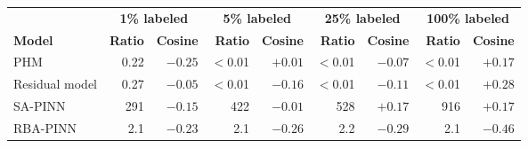 \begin{tabular}{lrrrrrrrr}
\toprule
 & \multicolumn{2}{c}{\textbf{1\% labeled}} & \multicolumn{2}{c}{\textbf{5\% labeled}} & \multicolumn{2}{c}{\textbf{25\% labeled}} & \multicolumn{2}{c}{\textbf{100\% labeled}} \\
\cmidrule(lr){2-3}\cmidrule(lr){4-5}\cmidrule(lr){6-7}\cmidrule(lr){8-9}
\textbf{Model} & \textbf{Ratio} & \textbf{Cosine} & \textbf{Ratio} & \textbf{Cosine} & \textbf{Ratio} & \textbf{Cosine} & \textbf{Ratio} & \textbf{Cosine} \\
\midrule
PHM & 0.22 & $-0.25$ & $<$0.01 & $+0.01$ & $<$0.01 & $-0.07$ & $<$0.01 & $+0.17$ \\
Residual model & 0.27 & $-0.05$ & $<$0.01 & $-0.16$ & $<$0.01 & $-0.11$ & $<$0.01 & $+0.28$ \\
SA-PINN & 291 & $-0.15$ & 422 & $-0.01$ & 528 & $+0.17$ & 916 & $+0.17$ \\
RBA-PINN & 2.1 & $-0.23$ & 2.1 & $-0.26$ & 2.2 & $-0.29$ & 2.1 & $-0.46$ \\
\bottomrule
\end{tabular}
